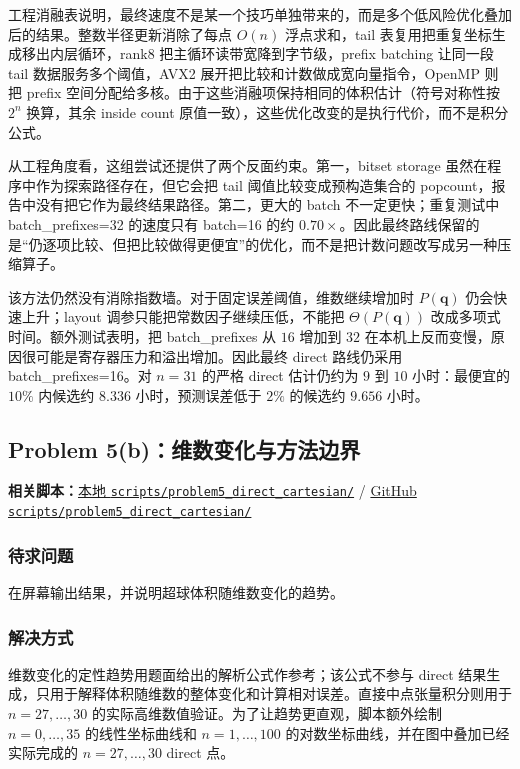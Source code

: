 \documentclass[12pt,a4paper,fontset=none]{ctexart}
\renewcommand{\texttt}[1]{{\ttfamily\footnotesize #1}}
\renewcommand{\texttt}[1]{{\ttfamily #1}}%
\newcommand{\fileinline}[1]{{\urlstyle{same}\nolinkurl{#1}}}
\newcommand{\metadataline}[1]{#1}
\newcommand{\scriptpath}[1]{\fileinline{#1}}
\newcommand{\githubscriptsbase}{https://github.com/Void0312Aurora/computational-physics-homework-2026/blob/main/07/scripts}
\newcommand{\scriptlink}[1]{\noindent\metadataline{\textbf{相关脚本：}\href{../../../scripts/#1}{本地 \scriptpath{scripts/#1}} / \href{\githubscriptsbase/#1}{GitHub \scriptpath{scripts/#1}}}\par\medskip}
\begin{document}
工程消融表说明，最终速度不是某一个技巧单独带来的，而是多个低风险优化叠加后的结果。整数半径更新消除了每点 \(O(n)\) 浮点求和，tail 表复用把重复坐标生成移出内层循环，rank8 把主循环读带宽降到字节级，prefix batching 让同一段 tail 数据服务多个阈值，AVX2 展开把比较和计数做成宽向量指令，OpenMP 则把 prefix 空间分配给多核。由于这些消融项保持相同的体积估计（符号对称性按 \(2^n\) 换算，其余 inside count 原值一致），这些优化改变的是执行代价，而不是积分公式。

从工程角度看，这组尝试还提供了两个反面约束。第一，bitset storage 虽然在程序中作为探索路径存在，但它会把 tail 阈值比较变成预构造集合的 popcount，报告中没有把它作为最终结果路径。第二，更大的 batch 不一定更快；重复测试中 \texttt{batch\_prefixes}=32 的速度只有 batch=16 的约 \(0.70\times\)。因此最终路线保留的是“仍逐项比较、但把比较做得更便宜”的优化，而不是把计数问题改写成另一种压缩算子。

该方法仍然没有消除指数墙。对于固定误差阈值，维数继续增加时
\(P(\mathbf q)\) 仍会快速上升；layout 调参只能把常数因子继续压低，不能把
\(\Theta(P(\mathbf q))\) 改成多项式时间。额外测试表明，把
\texttt{batch\_prefixes} 从 \(16\) 增加到 \(32\) 在本机上反而变慢，原因很可能是寄存器压力和溢出增加。因此最终 direct 路线仍采用 \texttt{batch\_prefixes=16}。对 \(n=31\) 的严格 direct 估计仍约为 \(9\) 到 \(10\) 小时：最便宜的 \(10\%\) 内候选约 \(8.336\) 小时，预测误差低于 \(2\%\) 的候选约 \(9.656\) 小时。

\subsection{Problem 5(b)：维数变化与方法边界}\label{problem-5b}

\scriptlink{problem5_direct_cartesian/}

\subsubsection{待求问题}\label{ux5f85ux6c42ux95eeux9898-11}

在屏幕输出结果，并说明超球体积随维数变化的趋势。

\subsubsection{解决方式}\label{ux89e3ux51b3ux65b9ux5f0f-11}

维数变化的定性趋势用题面给出的解析公式作参考；该公式不参与 direct 结果生成，只用于解释体积随维数的整体变化和计算相对误差。直接中点张量积分则用于 \(n=27,\ldots,30\) 的实际高维数值验证。为了让趋势更直观，脚本额外绘制 \(n=0,\ldots,35\) 的线性坐标曲线和 \(n=1,\ldots,100\) 的对数坐标曲线，并在图中叠加已经实际完成的 \(n=27,\ldots,30\) direct 点。
\end{document}
